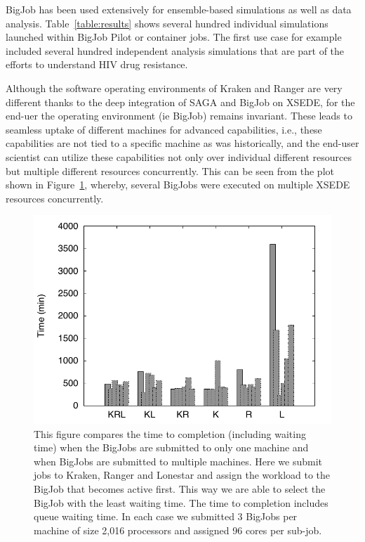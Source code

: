 \documentclass{sig-alternate}
\begin{document}

BigJob has been used extensively for ensemble-based simulations as well as data
analysis. Table~\ref{table:results} shows several hundred individual simulations
launched within BigJob Pilot or container jobs. The first use case for example
included several hundred independent analysis simulations that are part of the
efforts to understand HIV drug resistance.

Although the software operating environments of Kraken and Ranger are
very different thanks to the deep integration of SAGA and BigJob on
XSEDE, for the end-uer the operating environment (ie BigJob) remains
invariant.  These leads to seamless uptake of different machines for
advanced capabilities, i.e., these capabilities are not tied to a
specific machine as was historically, and the end-user scientist can
utilize these capabilities not only over individual different
resources but multiple different resources concurrently. This can be
seen from the plot shown in Figure~\ref{fig:multi_bigjob}, whereby,
several BigJobs were executed on multiple XSEDE resources
concurrently.

\begin{figure}
  \centering
  \includegraphics[scale=0.6]{figs/multi_bj_gnu}
  \caption{\footnotesize This figure compares the time to completion
    (including waiting time) when the BigJobs are submitted to only
    one machine and when BigJobs are submitted to multiple
    machines. Here we submit jobs to Kraken, Ranger and Lonestar and
    assign the workload to the BigJob that becomes active first. This
    way we are able to select the BigJob with the least waiting
    time. The time to completion includes queue waiting time. In each
    case we submitted 3 BigJobs per machine of size 2,016 processors
    and assigned 96 cores per sub-job. }
  \label{fig:multi_bigjob}
\end{figure}
\end{document}
